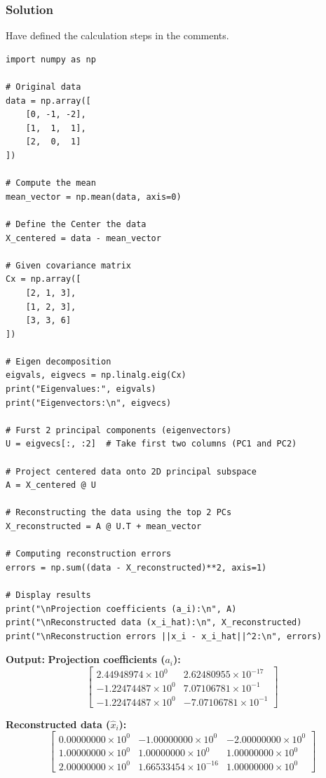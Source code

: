 \documentclass{article}
\begin{document}
\begin{enumerate}
    \subsubsection*{Solution}

    Have defined the calculation steps in the comments.
    \begin{verbatim}
import numpy as np

# Original data
data = np.array([
    [0, -1, -2],
    [1,  1,  1],
    [2,  0,  1]
])

# Compute the mean
mean_vector = np.mean(data, axis=0)

# Define the Center the data
X_centered = data - mean_vector

# Given covariance matrix
Cx = np.array([
    [2, 1, 3],
    [1, 2, 3],
    [3, 3, 6]
])

# Eigen decomposition
eigvals, eigvecs = np.linalg.eig(Cx)
print("Eigenvalues:", eigvals)
print("Eigenvectors:\n", eigvecs)

# Furst 2 principal components (eigenvectors)
U = eigvecs[:, :2]  # Take first two columns (PC1 and PC2)

# Project centered data onto 2D principal subspace
A = X_centered @ U

# Reconstructing the data using the top 2 PCs
X_reconstructed = A @ U.T + mean_vector

# Computing reconstruction errors
errors = np.sum((data - X_reconstructed)**2, axis=1)

# Display results
print("\nProjection coefficients (a_i):\n", A)
print("\nReconstructed data (x_i_hat):\n", X_reconstructed)
print("\nReconstruction errors ||x_i - x_i_hat||^2:\n", errors)

    \end{verbatim}

    \textbf{Output:}
    \textbf{Projection coefficients ($a_i$):}
    \[
    \begin{bmatrix}
        2.44948974 \times 10^0 & 2.62480955 \times 10^{-17} \\
     -1.22474487 \times 10^0 & 7.07106781 \times 10^{-1} \\
     -1.22474487 \times 10^0 & -7.07106781 \times 10^{-1}
    \end{bmatrix}
    \]

    \textbf{Reconstructed data ($\hat{x}_i$):}
    \[
    \begin{bmatrix}
        0.00000000 \times 10^0 & -1.00000000 \times 10^0 & -2.00000000 \times 10^0 \\
        1.00000000 \times 10^0 &  1.00000000 \times 10^0 &  1.00000000 \times 10^0 \\
        2.00000000 \times 10^0 &  1.66533454 \times 10^{-16} &  1.00000000 \times 10^0
    \end{bmatrix}
    \]


\end{enumerate}
\end{document}
